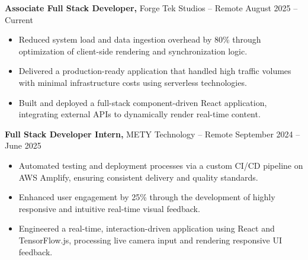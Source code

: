 \documentclass[11pt]{article}       %
\begin{document}
\textbf{Associate Full Stack Developer,} {Forge Tek Studios} -- Remote \hfill August 2025 -- Current 
\vspace{-9pt}
\begin{itemize}
  \item Reduced system load and data ingestion overhead by 80\% through optimization of client-side rendering and synchronization logic.
  \item Delivered a production-ready application that handled high traffic volumes with minimal infrastructure costs using serverless technologies.
  \item Built and deployed a full-stack component-driven React application, integrating external APIs to dynamically render real-time content.
\end{itemize}

\textbf{Full Stack Developer Intern,} {METY Technology} -- Remote \hfill September 2024 -- June 2025 
\vspace{-9pt}
\begin{itemize}
  \item Automated testing and deployment processes via a custom CI/CD pipeline on AWS Amplify, ensuring consistent delivery and quality standards.
  \item Enhanced user engagement by 25\% through the development of highly responsive and intuitive real-time visual feedback.
  \item Engineered a real-time, interaction-driven application using React and TensorFlow.js, processing live camera input and rendering responsive UI feedback.
\end{itemize}

\end{document}
